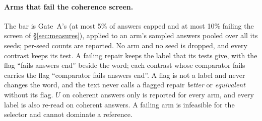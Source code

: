 \documentclass{article}
\theoremstyle{plain}
\theoremstyle{definition}
\theoremstyle{remark}
\begin{document}
\paragraph{Arms that fail the coherence screen.}
The bar is Gate~A's (at most 5\% of answers capped and at most 10\% failing
the screen of \S\ref{sec:measures}), applied to an arm's sampled answers
pooled over all its seeds; per-seed counts are reported. No arm and no seed is
dropped, and every contrast keeps its test. A failing repair keeps the label
that its tests give, with the flag ``fails answers end'' beside the word; each
contrast whose comparator fails carries the flag ``comparator fails answers
end''. A flag is not a label and never changes the word, and the text never
calls a flagged repair \emph{better} or \emph{equivalent} without its flag.
$U$ on coherent answers only is reported for every arm, and every label is
also re-read on coherent answers. A failing arm is infeasible for the selector
and cannot dominate a reference.
\end{document}
